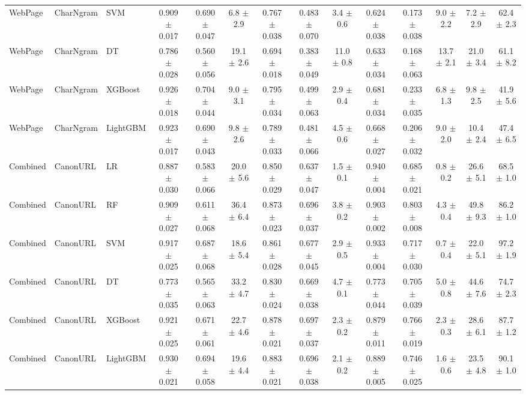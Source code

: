 \begin{tabular}{@{}lllccccccccccc@{}}
WebPage & CharNgram & SVM & 0.909 $\pm$ 0.017 & 0.690 $\pm$ 0.047 & 6.8 $\pm$ 2.9 & 0.767 $\pm$ 0.038 & 0.483 $\pm$ 0.070 & 3.4 $\pm$ 0.6 & 0.624 $\pm$ 0.038 & 0.173 $\pm$ 0.038 & 9.0 $\pm$ 2.2 & 7.2 $\pm$ 2.9 & 62.4 $\pm$ 2.3\\
WebPage & CharNgram & DT & 0.786 $\pm$ 0.028 & 0.560 $\pm$ 0.056 & 19.1 $\pm$ 2.6 & 0.694 $\pm$ 0.018 & 0.383 $\pm$ 0.049 & 11.0 $\pm$ 0.8 & 0.633 $\pm$ 0.034 & 0.168 $\pm$ 0.063 & 13.7 $\pm$ 2.1 & 21.0 $\pm$ 3.4 & 61.1 $\pm$ 8.2\\
WebPage & CharNgram & XGBoost & 0.926 $\pm$ 0.018 & 0.704 $\pm$ 0.044 & 9.0 $\pm$ 3.1 & 0.795 $\pm$ 0.034 & 0.499 $\pm$ 0.063 & 2.9 $\pm$ 0.4 & 0.681 $\pm$ 0.034 & 0.233 $\pm$ 0.035 & 6.8 $\pm$ 1.3 & 9.8 $\pm$ 2.5 & 41.9 $\pm$ 5.6\\
WebPage & CharNgram & LightGBM & 0.923 $\pm$ 0.017 & 0.690 $\pm$ 0.043 & 9.8 $\pm$ 2.6 & 0.789 $\pm$ 0.033 & 0.481 $\pm$ 0.066 & 4.5 $\pm$ 0.6 & 0.668 $\pm$ 0.027 & 0.206 $\pm$ 0.032 & 9.0 $\pm$ 2.0 & 10.4 $\pm$ 2.4 & 47.4 $\pm$ 6.5\\
\midrule
Combined & CanonURL & LR & 0.887 $\pm$ 0.030 & 0.583 $\pm$ 0.066 & 20.0 $\pm$ 5.6 & 0.850 $\pm$ 0.029 & 0.637 $\pm$ 0.047 & 1.5 $\pm$ 0.1 & 0.940 $\pm$ 0.004 & 0.685 $\pm$ 0.021 & 0.8 $\pm$ 0.2 & 26.6 $\pm$ 5.1 & 68.5 $\pm$ 1.0\\
Combined & CanonURL & RF & 0.909 $\pm$ 0.027 & 0.611 $\pm$ 0.068 & 36.4 $\pm$ 6.4 & 0.873 $\pm$ 0.023 & 0.696 $\pm$ 0.037 & 3.8 $\pm$ 0.2 & 0.903 $\pm$ 0.002 & 0.803 $\pm$ 0.008 & 4.3 $\pm$ 0.4 & 49.8 $\pm$ 9.3 & 86.2 $\pm$ 1.0\\
Combined & CanonURL & SVM & 0.917 $\pm$ 0.025 & 0.687 $\pm$ 0.068 & 18.6 $\pm$ 5.4 & 0.861 $\pm$ 0.028 & 0.677 $\pm$ 0.045 & 2.9 $\pm$ 0.5 & 0.933 $\pm$ 0.004 & 0.717 $\pm$ 0.030 & 0.7 $\pm$ 0.4 & 22.0 $\pm$ 5.1 & 97.2 $\pm$ 1.9\\
Combined & CanonURL & DT & 0.773 $\pm$ 0.035 & 0.565 $\pm$ 0.063 & 33.2 $\pm$ 4.7 & 0.830 $\pm$ 0.024 & 0.669 $\pm$ 0.038 & 4.7 $\pm$ 0.1 & 0.773 $\pm$ 0.044 & 0.705 $\pm$ 0.039 & 5.0 $\pm$ 0.8 & 44.6 $\pm$ 7.6 & 74.7 $\pm$ 2.3\\
Combined & CanonURL & XGBoost & 0.921 $\pm$ 0.025 & 0.671 $\pm$ 0.061 & 22.7 $\pm$ 4.6 & 0.878 $\pm$ 0.021 & 0.697 $\pm$ 0.037 & 2.3 $\pm$ 0.2 & 0.879 $\pm$ 0.011 & 0.766 $\pm$ 0.019 & 2.3 $\pm$ 0.3 & 28.6 $\pm$ 6.1 & 87.7 $\pm$ 1.2\\
Combined & CanonURL & LightGBM & 0.930 $\pm$ 0.021 & 0.694 $\pm$ 0.058 & 19.6 $\pm$ 4.4 & 0.883 $\pm$ 0.021 & 0.696 $\pm$ 0.038 & 2.1 $\pm$ 0.2 & 0.889 $\pm$ 0.005 & 0.746 $\pm$ 0.025 & 1.6 $\pm$ 0.6 & 23.5 $\pm$ 4.8 & 90.1 $\pm$ 1.0\\

\end{tabular}
